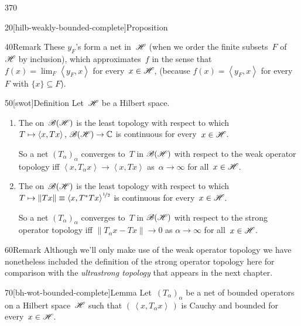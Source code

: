 \begin{parsec}{370}
\begin{point}{20}[hilb-weakly-bounded-complete]{Proposition}
\begin{point}{40}{Remark}
These $y_F$'s form a net in~$\mathscr{H}$
(when we order the finite subsets~$F$ of~$\mathscr{H}$ by inclusion),
which approximates~$f$ in the
sense that~$f(x)=\lim_F \left<y_F,x\right>$
for every~$x\in \mathscr{H}$,
(because 
$f(x)=\left<y_F,x\right>$
for every~$F$
with $\{x\}\subseteq F$).
\end{point}
\end{point}
\begin{point}{50}[swot]{Definition}%
Let~$\mathscr{H}$ be a Hilbert space.
\begin{enumerate}
\item
	The %
on~$\mathscr{B}(\mathscr{H})$ is the least topology
with respect to which $T\mapsto \left<x,Tx\right>,\,\mathscr{B}(\mathscr{H})\to\mathbb{C}$
is continuous for every~$x\in\mathscr{H}$.

So a net $(T_\alpha)_\alpha$
		converges to~$T$ in $\mathscr{B}(\mathscr{H})$
		with respect to the weak operator topology
		iff $\left<x,T_\alpha x\right>\to \left<x,Tx\right>$
		as~$\alpha\to\infty$ for all~$x\in \mathscr{H}$.
\item
	The %
on~$\mathscr{B}(\mathscr{H})$ is the least topology
with respect to which $T\mapsto \|Tx\|\equiv \smash{\left<x,T^*Tx\right>^{%
\nicefrac{1}{2}}}$
is continuous for every~$x\in\mathscr{H}$.

		So a net $(T_\alpha)_\alpha$
		converges to~$T$
		in $\mathscr{B}(\mathscr{H})$
		with respect to the strong operator topology iff
		$\|T_\alpha x -Tx \| \to 0$ as $\alpha\to\infty$
		for all~$x\in\mathscr{H}$.
\end{enumerate}
\begin{point}{60}{Remark}%
Although we'll only make use of the weak operator
topology we have nonetheless included
the definition of the strong operator topology here
for comparison
with the \emph{ultrastrong
topology} that appears in the next chapter.
\end{point}
\end{point}
\begin{point}{70}[bh-wot-bounded-complete]{Lemma}%
Let~$(T_\alpha)_\alpha$ be a net of bounded operators
on a Hilbert space~$\mathscr{H}$
such that $(\,\left<x,T_\alpha x \right>\,)$ is
Cauchy and bounded for every~$x\in \mathscr{H}$.


\end{point}
\end{parsec}
